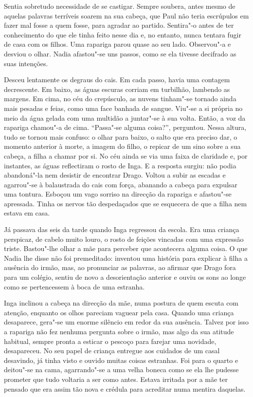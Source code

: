 Sentia sobretudo necessidade de se castigar. Sempre soubera, antes mesmo
de aquelas palavras terríveis soarem na sua cabeça, que Paul não teria
escrúpulos em fazer mal fosse a quem fosse, para agradar ao partido.
Sentira"-o antes de ter conhecimento do que ele tinha feito nesse dia e,
no entanto, nunca tentara fugir de casa com os filhos. Uma rapariga
parou quase ao seu lado. Observou"-a e desviou o olhar. Nadia afastou"-se
uns passos, como se ela tivesse decifrado as suas intenções.

Desceu lentamente os degraus do cais. Em cada passo, havia uma contagem
decrescente. Em baixo, as águas escuras corriam em turbilhão, lambendo
as margens. Em cima, no céu do crepúsculo, as nuvens tinham"-se tornado
ainda mais pesadas e feias, como uma face banhada de sangue. Viu"-se a si
própria no meio da água gelada com uma multidão a juntar"-se à sua
volta. Então, a voz da rapariga chamou"-a de cima. ``Passa"-se alguma
coisa?'', perguntou. Nessa altura, tudo se tornou mais confuso: o olhar
para baixo, o salto que era preciso dar, o momento anterior à
morte, a imagem do filho, o repicar de um sino sobre a sua cabeça, a
filha a chamar por si. No céu ainda se via uma faixa de claridade e, por
instantes, as águas reflectiram o rosto de Inga. E a resposta surgiu:
não podia abandoná"-la nem desistir de encontrar Drago. Voltou a subir as
escadas e agarrou"-se à balaustrada do cais com força, abanando a cabeça
para expulsar uma tontura. Esboçou um vago sorriso na direcção da
rapariga e afastou"-se apressada. Tinha os nervos tão despedaçados que se
esquecera de que a filha nem estava em casa.

Já passava das seis da tarde quando Inga regressou da escola. Era uma
criança perspicaz, de cabelo muito louro, o rosto de feições vincadas
com uma expressão triste. Bastou"-lhe olhar a mãe para perceber que
acontecera alguma coisa. O que Nadia lhe disse não foi premeditado:
inventou uma história para explicar à filha a ausência do irmão, mas, ao
pronunciar as palavras, ao afirmar que Drago fora para um colégio,
sentiu de novo a desorientação anterior e ouviu os sons ao longe como
se pertencessem à boca de uma estranha.

Inga inclinou a cabeça na direcção da mãe, numa postura de quem escuta
com atenção, enquanto os olhos pareciam vaguear pela casa. Quando uma
criança desaparece, gera"-se um enorme silêncio em redor da sua
ausência. Talvez por isso a rapariga não fez nenhuma pergunta sobre o
irmão, mas algo da sua atitude habitual, sempre pronta a esticar o
pescoço para farejar uma novidade, desapareceu. No seu papel de
criança entregue aos cuidados de um casal desavindo, já tinha visto e
ouvido muitas coisas estranhas. Foi para o quarto e deitou"-se na cama,
agarrando"-se a uma velha boneca como se ela lhe pudesse prometer que tudo
voltaria a ser como antes. Estava irritada por a mãe ter pensado que
era assim tão nova e crédula para acreditar numa mentira daquelas.

